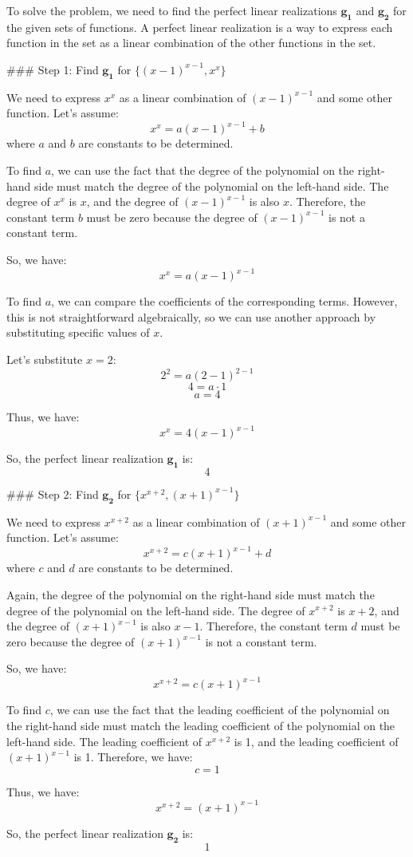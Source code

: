 To solve the problem, we need to find the perfect linear realizations \(\mathbf{g_1}\) and \(\mathbf{g_2}\) for the given sets of functions. A perfect linear realization is a way to express each function in the set as a linear combination of the other functions in the set.

### Step 1: Find \(\mathbf{g_1}\) for \(\{ (x-1)^{x-1}, x^x \}\)

We need to express \(x^x\) as a linear combination of \((x-1)^{x-1}\) and some other function. Let's assume:
\[ x^x = a(x-1)^{x-1} + b \]
where \(a\) and \(b\) are constants to be determined.

To find \(a\), we can use the fact that the degree of the polynomial on the right-hand side must match the degree of the polynomial on the left-hand side. The degree of \(x^x\) is \(x\), and the degree of \((x-1)^{x-1}\) is also \(x\). Therefore, the constant term \(b\) must be zero because the degree of \((x-1)^{x-1}\) is not a constant term.

So, we have:
\[ x^x = a(x-1)^{x-1} \]

To find \(a\), we can compare the coefficients of the corresponding terms. However, this is not straightforward algebraically, so we can use another approach by substituting specific values of \(x\).

Let's substitute \(x = 2\):
\[ 2^2 = a(2-1)^{2-1} \]
\[ 4 = a \cdot 1 \]
\[ a = 4 \]

Thus, we have:
\[ x^x = 4(x-1)^{x-1} \]

So, the perfect linear realization \(\mathbf{g_1}\) is:
\[ \boxed{4} \]

### Step 2: Find \(\mathbf{g_2}\) for \(\{ x^{x+2}, (x+1)^{x-1} \}\)

We need to express \(x^{x+2}\) as a linear combination of \((x+1)^{x-1}\) and some other function. Let's assume:
\[ x^{x+2} = c(x+1)^{x-1} + d \]
where \(c\) and \(d\) are constants to be determined.

Again, the degree of the polynomial on the right-hand side must match the degree of the polynomial on the left-hand side. The degree of \(x^{x+2}\) is \(x+2\), and the degree of \((x+1)^{x-1}\) is also \(x-1\). Therefore, the constant term \(d\) must be zero because the degree of \((x+1)^{x-1}\) is not a constant term.

So, we have:
\[ x^{x+2} = c(x+1)^{x-1} \]

To find \(c\), we can use the fact that the leading coefficient of the polynomial on the right-hand side must match the leading coefficient of the polynomial on the left-hand side. The leading coefficient of \(x^{x+2}\) is 1, and the leading coefficient of \((x+1)^{x-1}\) is 1. Therefore, we have:
\[ c = 1 \]

Thus, we have:
\[ x^{x+2} = (x+1)^{x-1} \]

So, the perfect linear realization \(\mathbf{g_2}\) is:
\[ \boxed{1} \]